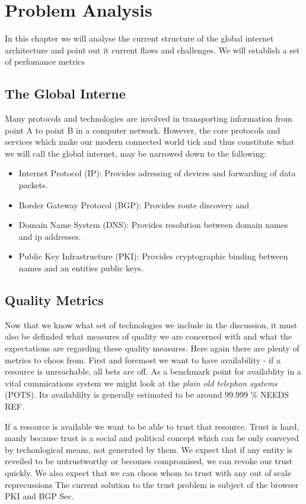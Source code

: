 \documentclass[../eva1_scion.tex]{subfiles}
\begin{document}
\chapter{Problem Analysis}\label{ch:analysis}

In this chapter we will analyse the current structure of the global internet architecture and point out it current flaws and challenges. We will establish a set of perfomance metrics 
\section{The Global Interne}%
\label{sec:the_global_internet}

Many protocols and technologies are involved in transporting information from point A to point B in a computer network. However, the core protocols and services which make our modern connected world tick and thus constitute what we will call the global internet, may be narrowed down to the following:

\begin{itemize}
    \item Internet Protocol (IP): Provides adressing of devices and forwarding of data packets.
    \item Border Gateway Protocol (BGP): Provides route discovery and 
    \item Domain Name System (DNS): Provides resolution between domain names and ip addresses.
    \item Public Key Infrastructure (PKI): Provides cryptographic binding between names and an entities public keys.
\end{itemize}

\section{Quality Metrics}%
\label{sec:quality_metrics}

Now that we know what set of technologies we include in the discussion, it must also be definded what measures of quality we are concerned with and what the expectations are regarding these quality measures. Here again there are plenty of metrics to choos from. First and foremost we want to have availability - if a resource is unreachable, all bets are off. As a benchmark point for availablity in a vital cummications system we might look at the \textit{plain old telephon systems} (POTS). Its availablilty is generally estimated to be around 99.999 \% NEEDS REF.

If a resource is available we want to be able to trust that resource. Trust is hard, manly because trust is a social and political concept which can be only conveyed by techonlogical means, not generated by them. We expect that if any entity is reveiled to be untrustworthy or becomes compromised, we can revoke our trust quickly. We also expect that we can choos whom to trust with any out of scale reprecussions The current solution to the trust problem is subject of the browser PKI and BGP Sec.
\end{document}
